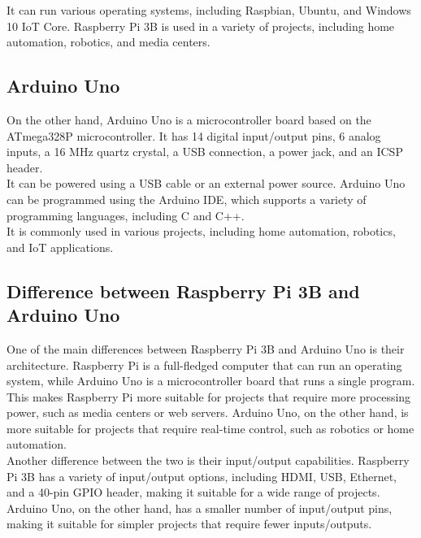 \documentclass[11pt]{article}
\begin{document}
It can run various operating systems, including Raspbian, Ubuntu, and Windows 10 IoT Core. Raspberry Pi 3B is used in a variety of projects, including home automation, robotics, and media centers.\\

\subsection{Arduino Uno}
On the other hand, Arduino Uno is a microcontroller board based on the ATmega328P microcontroller. It has 14 digital input/output pins, 6 analog inputs, a 16 MHz quartz crystal, a USB connection, a power jack, and an ICSP header.\\

It can be powered using a USB cable or an external power source. Arduino Uno can be programmed using the Arduino IDE, which supports a variety of programming languages, including C and C++. \\

It is commonly used in various projects, including home automation, robotics, and IoT applications.

\subsection{Difference between Raspberry Pi 3B and Arduino Uno}

One of the main differences between Raspberry Pi 3B and Arduino Uno is their architecture. Raspberry Pi is a full-fledged computer that can run an operating system, while Arduino Uno is a microcontroller board that runs a single program. \\

This makes Raspberry Pi more suitable for projects that require more processing power, such as media centers or web servers. Arduino Uno, on the other hand, is more suitable for projects that require real-time control, such as robotics or home automation.\\



Another difference between the two is their input/output capabilities. Raspberry Pi 3B has a variety of input/output options, including HDMI, USB, Ethernet, and a 40-pin GPIO header, making it suitable for a wide range of projects. Arduino Uno, on the other hand, has a smaller number of input/output pins, making it suitable for simpler projects that require fewer inputs/outputs.\\
\end{document}
